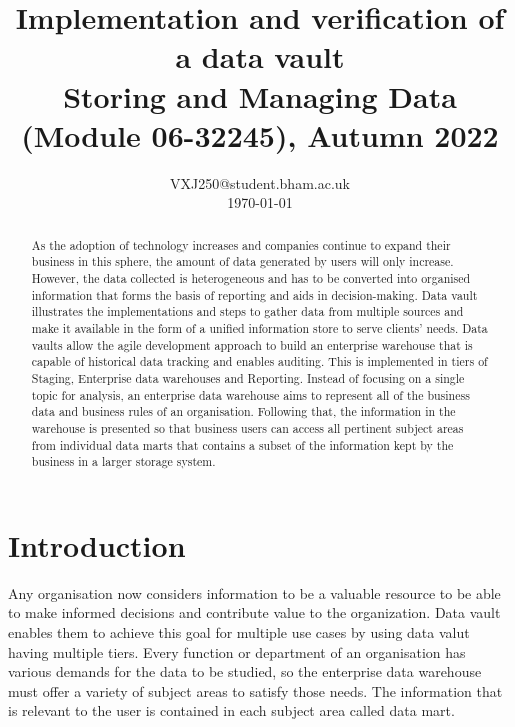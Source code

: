 \documentclass[conference]{IEEEtran}
\begin{document}
\title{Implementation and verification of a data vault\\\Large Storing and Managing Data (Module 06-32245), Autumn 2022}

\author{
VXJ250@student.bham.ac.uk\\%
\today}


\maketitle

\begin{abstract}
As the adoption of technology increases and companies continue to expand their business in this sphere, the amount of data generated by users will only increase. However, the data collected is heterogeneous and has to be converted into organised information that forms the basis of reporting and aids in decision-making. Data vault illustrates the implementations and steps to gather data from multiple sources and make it available in the form of a unified information store to serve clients' needs. Data vaults allow the agile development approach to build an enterprise warehouse that is capable of historical data tracking and enables auditing. This is implemented in tiers of Staging, Enterprise data warehouses and Reporting. Instead of focusing on a single topic for analysis, an enterprise data warehouse aims to represent all of the business data and business rules of an organisation. Following that, the information in the warehouse is presented so that business users can access all pertinent subject areas from individual data marts that contains a subset of the information kept by the business in a larger storage system.
\end{abstract}

\section{Introduction}\label{sec:Intro}
Any organisation now considers information to be a valuable resource to be able to make informed decisions and contribute value to the organization. Data vault enables them to achieve this goal for multiple use cases by using data valut having multiple tiers. Every function or department of an organisation has various demands for the data to be studied, so the enterprise data warehouse must offer a variety of subject areas to satisfy those needs. The information that is relevant to the user is contained in each subject area called data mart.
\end{document}
